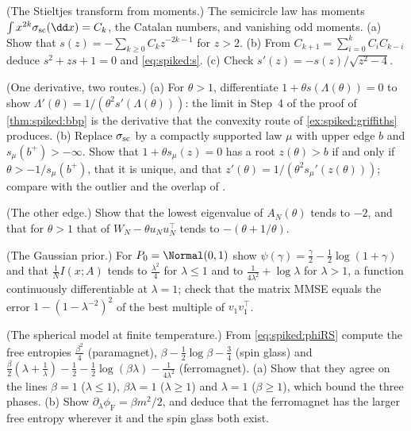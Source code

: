 \begin{refsection}
\begin{exercises}
\item \consolidation (The Stieltjes transform from moments.) The semicircle law has moments $\int x^{2k}\spikedsc(\dd x)=C_k$, the Catalan numbers, and vanishing odd moments. (a) Show that $s(z)=-\sum_{k\ge0}C_kz^{-2k-1}$ for $z>2$. (b) From $C_{k+1}=\sum_{i=0}^kC_iC_{k-i}$ deduce $s^2+zs+1=0$ and \eqref{eq:spiked:s}. (c) Check $s'(z)=-s(z)/\sqrt{z^2-4}$.\label{ex:spiked:catalan}

\item \consolidation (One derivative, two routes.) (a) For $\theta>1$, differentiate $1+\theta s(\Lambda(\theta))=0$ to show $\Lambda'(\theta)=1/(\theta^2s'(\Lambda(\theta)))$: the limit in Step~4 of the proof of \cref{thm:spiked:bbp} is the derivative that the convexity route of \cref{ex:spiked:griffiths} produces. (b) Replace $\sigma_{\mathrm{sc}}$ by a compactly supported law $\mu$ with upper edge $b$ and $s_\mu(b^+)>-\infty$. Show that $1+\theta s_\mu(z)=0$ has a root $z(\theta)>b$ if and only if $\theta>-1/s_\mu(b^+)$, that it is unique, and that $z'(\theta)=1/(\theta^2s_\mu'(z(\theta)))$; compare with the outlier and the overlap of \textcite{BenaychGeorgesNadakuditi2011}.\label{ex:spiked:bgn}

\item \consolidation (The other edge.) Show that the lowest eigenvalue of $A_N(\theta)$ tends to $-2$, and that for $\theta>1$ that of $W_N-\theta u_Nu_N^\top$ tends to $-(\theta+1/\theta)$.\label{ex:spiked:negative}

\item \consolidation (The Gaussian prior.) For $P_0=\Normal(0,1)$ show $\psi(\gamma)=\frac\gamma2-\frac12\log(1+\gamma)$ and that $\frac1NI(x;A)$ tends to $\frac{\lambda^2}4$ for $\lambda\le1$ and to $\frac1{4\lambda^2}+\log\lambda$ for $\lambda>1$, a function continuously differentiable at $\lambda=1$; check that the matrix MMSE equals the error $1-(1-\lambda^{-2})^2$ of the best multiple of $v_1v_1^\top$.\label{ex:spiked:gaussian}

\item \byhand (The spherical model at finite temperature.) From \eqref{eq:spiked:phiRS} compute the free entropies $\frac{\beta^2}4$ (paramagnet), $\beta-\frac12\log\beta-\frac34$ (spin glass) and $\frac\beta2(\lambda+\frac1\lambda)-\frac12-\frac12\log(\beta\lambda)-\frac1{4\lambda^2}$ (ferromagnet). (a) Show that they agree on the lines $\beta=1$ ($\lambda\le1$), $\beta\lambda=1$ ($\lambda\ge1$) and $\lambda=1$ ($\beta\ge1$), which bound the three phases. (b) Show $\partial_\lambda\phi_{\mathrm F}=\beta m^2/2$, and deduce that the ferromagnet has the larger free entropy wherever it and the spin glass both exist.\label{ex:spiked:finiteT}


\end{exercises}
\end{refsection}
